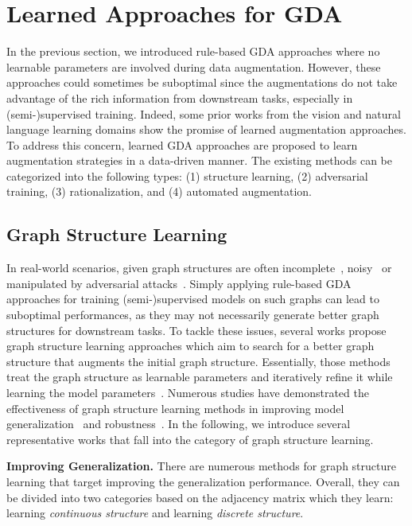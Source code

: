 \documentclass[11pt]{article}
\renewcommand\paragraph[1]{\vspace{0.05in} \noindent \textbf{#1.}}
\begin{document}
\section{Learned Approaches for GDA}
\label{sec:learnedaug}

In the previous section, we introduced rule-based GDA approaches where no learnable parameters are involved during data augmentation. However, these approaches could sometimes be suboptimal since the augmentations do not take advantage of the rich information from downstream tasks, especially in (semi-)supervised training. Indeed, some prior works from the vision \cite{cubuk2019autoaugment} and natural language \cite{niu2019automatically} learning domains show the promise of learned augmentation approaches. To address this concern, learned GDA approaches are proposed to learn augmentation strategies in a data-driven manner. The existing methods can be categorized into the following types: (1) structure learning, (2) adversarial training, (3) rationalization, and (4) automated augmentation.


\subsection{Graph Structure Learning}
\label{sec:gsl}
In real-world scenarios, given graph structures are often incomplete~\cite{franceschi2019learning}, noisy~\cite{jin2020graph,luo2021learning} or manipulated by adversarial attacks~\cite{jin2020adversarial,gunnemann2022graph}. Simply applying rule-based GDA approaches for training (semi-)supervised models on such graphs can lead to suboptimal performances, as they may not necessarily generate better graph structures for downstream tasks. To tackle these issues, several works propose graph structure learning approaches which aim to search for a better graph structure that augments the initial graph structure.
Essentially, those methods treat the graph structure as learnable parameters and iteratively refine it while learning the model parameters~\cite{zhao2021data,jin2020graph,franceschi2019learning,chen2020iterative,luo2021learning,zheng2020robust}. Numerous studies have demonstrated the effectiveness of graph structure learning methods in improving model generalization~\cite{zhao2021data,chen2020iterative} and robustness~\cite{jin2020graph,zheng2020robust}. In the following, we introduce several representative works that fall into the category of graph structure learning. 

\paragraph{Improving Generalization} There are numerous methods for graph structure learning that target improving the generalization performance. Overall, they can be divided into two categories based on the adjacency matrix which they learn: learning \emph{continuous structure} and learning \emph{discrete structure}.
\end{document}
